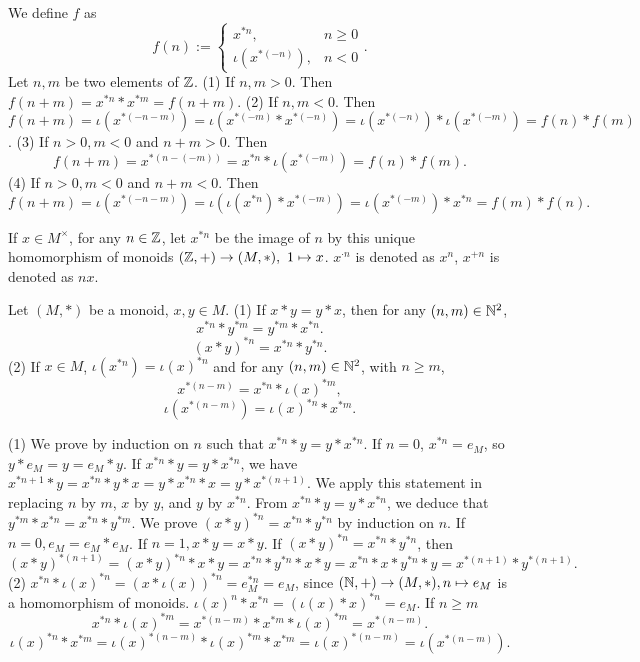 \begin{proofenv}
    We define $f$ as 
    $$f(n):=\left\{\begin{matrix}
        x^{*n}, &n\ge 0\\
        \iota(x^{*(-n)}), &n<0
    \end{matrix}\right. .$$
    Let $n, m$ be two elements of $\mathbb{Z}$.
    \newline
    (1) If $n, m>0$. Then $f(n+m)=x^{*n}*x^{*m}=f(n+m)$.
    \newline
    (2) If $n, m<0$. Then $f(n+m)=\iota(x^{*(-n-m)})=\iota(x^{*(-m)}*x^{*(-n)})=\iota(x^{*(-n)})*\iota(x^{*(-m)})=f(n)*f(m)$.
    \newline
    (3) If $n>0, m<0$ and $n+m>0$. Then $$f(n+m)=x^{*(n-(-m))}=x^{*n}*\iota(x^{*(-m)})=f(n)*f(m).$$
    (4) If $n>0, m<0$ and $n+m<0$. Then $$f(n+m)=\iota(x^{*(-n-m)})=\iota(\iota(x^{*n})*x^{*(-m)})=\iota(x^{*(-m)})*x^{*n}=f(m)*f(n).$$
\end{proofenv}
\begin{notationenv}
    If $x\in M^\times$,  for any $n\in \mathbb{Z}$,  let $x^{*n}$ be the image of $n$ by this unique homomorphism of monoids $(\mathbb{Z}, +)\rightarrow (M, *), \ 1\mapsto x$. $x^{\cdot n}$ is denoted as $x^n$,  $x^{+n}$ is denoted as $nx$.
\end{notationenv}
\begin{propositionenv}
    Let $(M, *)$ be a monoid,  $x, y\in M$.
    \newline
    (1) If $x*y=y*x$,  then for any $(n, m)\in \mathbb{N}^2$, 
     $$x^{*n}*y^{*m}=y^{*m}*x^{*n}.$$ 
     $$(x*y)^{*n}=x^{*n}*y^{*n}.$$
    \newline
    (2) If $x\in M$,  $\iota(x^{*n})=\iota(x)^{*n}$ and for any $(n, m)\in \mathbb{N}^2$,  with $n\ge m$, 
    $$x^{*(n-m)}=x^{*n}*\iota(x)^{*m}, $$
    $$\iota(x^{*(n-m)})=\iota(x)^{*n}*x^{*m}.$$
\end{propositionenv}
\begin{proofenv}
   \quad
   \newline
    (1) We prove by induction on $n$ such that $x^{*n}*y=y*x^{*n}$.
    If $n=0$,  $x^{*n}=e_M$,  so $y*e_M=y=e_M*y$. If $x^{*n}*y=y*x^{*n}$,  we have $x^{*n+1}*y=x^{*n}*y*x=y*x^{*n}*x=y*x^{*(n+1)}$. We apply this  statement in replacing $n$ by $m$,  $x$ by $y$,  and $y$ by $x^{*n}$. From $x^{*n}*y=y*x^{*n}$,  we deduce that $y^{*m}*x^{*n}=x^{*n}*y^{*m}$. We prove $(x*y)^{*n}=x^{*n}*y^{*n}$ by induction on $n$. If $n=0, e_M=e_M*e_M$. If $n=1, x*y=x*y$. If $(x*y)^{*n}=x^{*n}*y^{*n}$,  then $$(x*y)^{*(n+1)}=(x*y)^{*n}*x*y=x^{*n}*y^{*n}*x*y=x^{*n}*x*y^{*n}*y=x^{*(n+1)}*y^{*(n+1)}.$$
    (2) $x^{*n}*\iota(x)^{*n}=(x*\iota(x))^{*n}=e_{M}^{*n} = e_{M}$,  since $(\mathbb{N}, +)\rightarrow (M, *),  n\mapsto e_M$ is a homomorphism of monoids. $\iota(x)^n* x^{*n} = (\iota(x) * x)^{*n} = e_{M}$. If $n \geq m$ 
$$
x^{*n} * \iota(x)^{*m} = x^{*(n-m)} * x^{*m} * \iota(x)^{*m} = x^{*(n-m)}
.$$
$$
\iota(x)^{*n} * x^{*m} = \iota(x)^{*(n-m)} * \iota(x)^{*m} * x^{*m}=\iota(x)^{*(n-m)}=\iota(x^{*(n-m)})
.$$
\end{proofenv}
